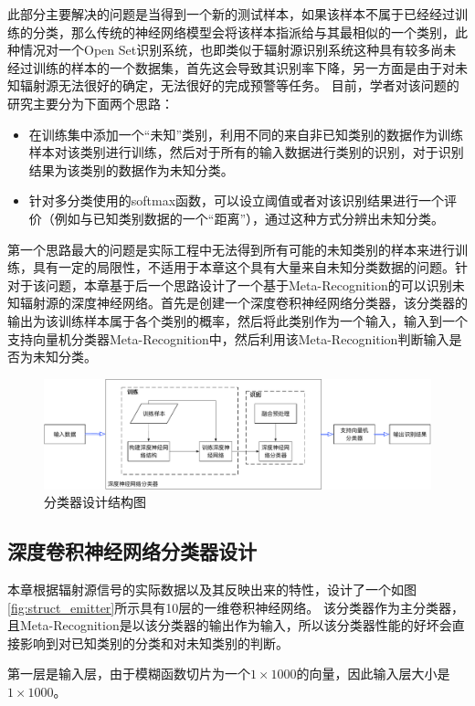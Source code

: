 此部分主要解决的问题是当得到一个新的测试样本，如果该样本不属于已经经过训练的分类，那么传统的神经网络模型会将该样本指派给与其最相似的一个类别，此种情况对一个Open Set识别系统，也即类似于辐射源识别系统这种具有较多尚未经过训练的样本的一个数据集，首先这会导致其识别率下降，另一方面是由于对未知辐射源无法很好的确定，无法很好的完成预警等任务。
目前，学者对该问题的研究主要分为下面两个思路：
\begin{itemize}
	\item 在训练集中添加一个“未知”类别，利用不同的来自非已知类别的数据作为训练样本对该类别进行训练，然后对于所有的输入数据进行类别的识别，对于识别结果为该类别的数据作为未知分类。
	\item 针对多分类使用的softmax函数，可以设立阈值或者对该识别结果进行一个评价（例如与已知类别数据的一个“距离”），通过这种方式分辨出未知分类。
\end{itemize}
第一个思路最大的问题是实际工程中无法得到所有可能的未知类别的样本来进行训练，具有一定的局限性，不适用于本章这个具有大量来自未知分类数据的问题。针对于该问题，本章基于后一个思路设计了一个基于Meta-Recognition的可以识别未知辐射源的深度神经网络。首先是创建一个深度卷积神经网络分类器，该分类器的输出为该训练样本属于各个类别的概率，然后将此类别作为一个输入，输入到一个支持向量机分类器Meta-Recognition中，然后利用该Meta-Recognition判断输入是否为未知分类。
\begin{figure}[hbt]
	\centering
	\includegraphics[width=13.5cm]{figures/emitter/frame_emitter}
	\caption{分类器设计结构图}
\end{figure}

\subsection{深度卷积神经网络分类器设计}
本章根据辐射源信号的实际数据以及其反映出来的特性，设计了一个如图\ref{fig:struct_emitter}所示具有10层的一维卷积神经网络。
该分类器作为主分类器，且Meta-Recognition是以该分类器的输出作为输入，所以该分类器性能的好坏会直接影响到对已知类别的分类和对未知类别的判断。

第一层是输入层，由于模糊函数切片为一个$1 \times 1000$的向量，因此输入层大小是$1 \times 1000$。

